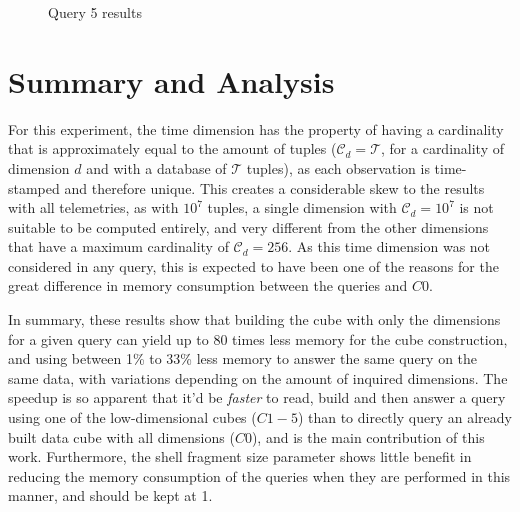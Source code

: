 \begin{figure}[H]
  \caption{Query 5 results}\label{fig:query5}
  \vspace{6mm}
  \begin{center}
  \end{center}
  \vspace{2mm}
\end{figure}

\section{Summary and Analysis}\label{ch:querypart:summary}

For this experiment, the time dimension has the property of having a cardinality that is approximately equal to the amount of tuples (\(\mathcal{C}_d = \mathcal{T}\), for a cardinality of dimension \(d\) and with a database of \(\mathcal{T}\) tuples), as each observation is time-stamped and therefore unique.
This creates a considerable skew to the results with all telemetries, as with \(\ensuremath{10^{7}}\) tuples, a single dimension with \(\mathcal{C}_d = {10}^7\) is not suitable to be computed entirely, and very different from the other dimensions that have a maximum cardinality of \(\mathcal{C}_d = 256\).
As this time dimension was not considered in any query, this is expected to have been one of the reasons for the great difference in memory consumption between the queries and $C0$.

In summary, these results show that building the cube with only the dimensions for a given query can yield up to 80 times less memory for the cube construction, and using between 1\% to 33\% less memory to answer the same query on the same data, with variations depending on the amount of inquired dimensions.
The speedup is so apparent that it'd be \emph{faster} to read, build and then answer a query using one of the low-dimensional cubes (\(C1-5\)) than to directly query an already built data cube with all dimensions (\(C0\)), and is the main contribution of this work.
Furthermore, the shell fragment size parameter shows little benefit in reducing the memory consumption of the queries when they are performed in this manner, and should be kept at 1.

